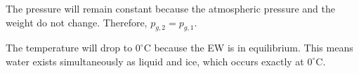 The pressure will remain constant because the atmospheric pressure and the weight do not change. Therefore, \( p_{g,2} = p_{g,1} \).  

The temperature will drop to \( 0^\circ \text{C} \) because the EW is in equilibrium. This means water exists simultaneously as liquid and ice, which occurs exactly at \( 0^\circ \text{C} \).